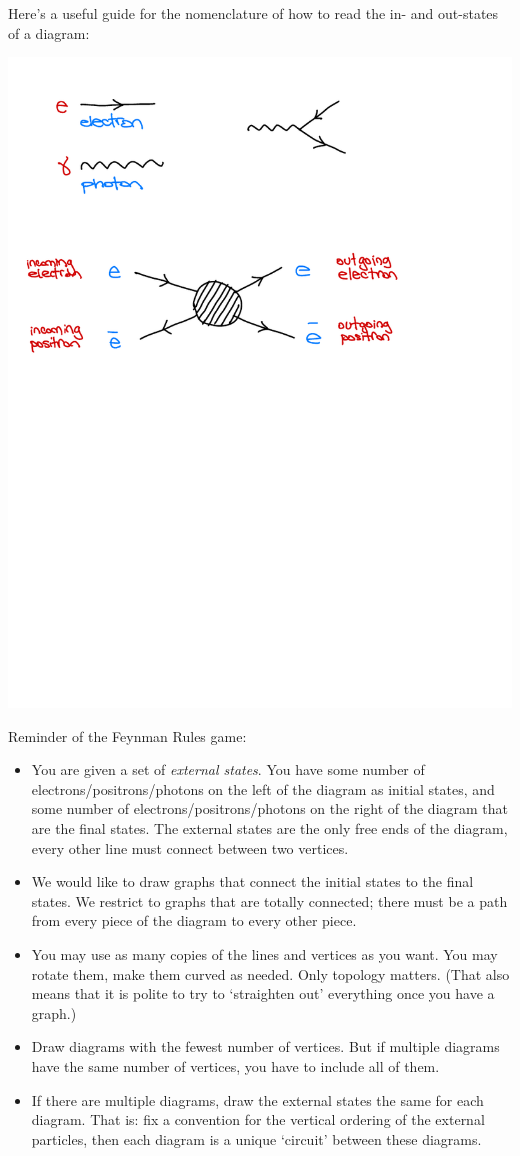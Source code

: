 \documentclass[12pt]{article}
\numberwithin{equation}{section}    %
\begin{document}
Here's a useful guide for the nomenclature of how to read the in- and out-states of a diagram:
\begin{center}
	\includegraphics[width=.7\textwidth]{figures/HW2a_nomenclature.pdf}
\end{center}

Reminder of the Feynman Rules game:
\begin{itemize}
	\item You are given a set of \emph{external states}. You have some number of electrons/positrons/photons on the left of the diagram as initial states, and some number of electrons/positrons/photons on the right of the diagram that are the final states. The external states are the only free ends of the diagram, every other line must connect between two vertices.
	\item We would like to draw graphs that connect the initial states to the final states. We restrict to graphs that are totally connected; there must be a path from every piece of the diagram to every other piece.
	\item You may use as many copies of the lines and vertices as you want. You may rotate them, make them curved as needed. Only topology matters. (That also means that it is polite to try to `straighten out' everything once you have a graph.)
	\item Draw diagrams with the fewest number of vertices. But if multiple diagrams have the same number of vertices, you have to include all of them.
	\item If there are multiple diagrams, draw the external states the same for each diagram. That is: fix a convention for the vertical ordering of the external particles, then each diagram is a unique `circuit' between these diagrams.
\end{itemize}
\end{document}
